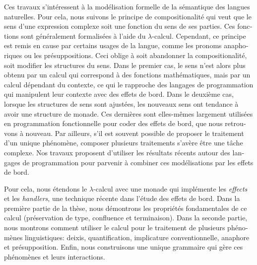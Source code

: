 \AbstractsOnEvenPage
\DontNumberAbstractPages

\begin{ThesisAbstract}
\vspace*{-1cm}

  \begin{FrenchAbstract}

    \begin{french}
    Ces travaux s’intéressent à la modélisation formelle de la sémantique
    des langues naturelles. Pour cela, nous suivons le principe de
    compositionalité qui veut que le sens d’une expression complexe soit
    une fonction du sens de ses parties. Ces fonctions sont généralement
    formalisées à l’aide du $\lambda$-calcul. Cependant, ce principe est
    remis en cause par certains usages de la langue, comme les pronoms
    anaphoriques ou les présuppositions. Ceci oblige à soit abandonner la
    compositionalité, soit modifier les structures du sens. Dans le premier
    cas, le sens n’est alors plus obtenu par un calcul qui correspond à des
    fonctions mathématiques, mais par un calcul dépendant du contexte, ce
    qui le rapproche des langages de programmation qui manipulent leur
    contexte avec des effets de bord. Dans le deuxième cas, lorsque les
    structures de sens sont ajustées, les nouveaux sens ont tendance à
    avoir une structure de monade. Ces dernières sont elles-mêmes largement
    utilisées en programmation fonctionnelle pour coder des effets de bord,
    que nous retrouvons à nouveau. Par ailleurs, s’il est souvent possible
    de proposer le traitement d’un unique phénomène, composer plusieurs
    traitements s’avère être une tâche complexe. Nos travaux proposent
    d’utiliser les résultats récents autour des langages de programmation
    pour parvenir à combiner ces modélisations par les effets de bord.

    Pour cela, nous étendons le $\lambda$-calcul avec une monade qui
    implémente les \textit{effects} et les \textit{handlers}, une technique
    récente dans l’étude des effets de bord. Dans la première partie de la
    thèse, nous démontrons les propriétés fondamentales de ce calcul
    (préservation de type, confluence et terminaison). Dans la seconde
    partie, nous montrons comment utiliser le calcul pour le traitement de
    plusieurs phénomènes linguistiques: deixis, quantification, implicature
    conventionnelle, anaphore et présupposition. Enfin, nous construisons
    une unique grammaire qui gère ces phénomènes et leurs interactions.
    

\end{french}
\end{FrenchAbstract}
\end{ThesisAbstract}
